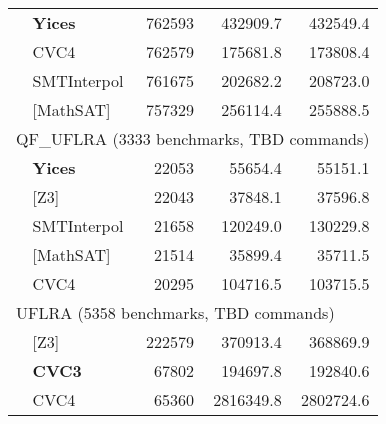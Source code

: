 \begin{tabular}{|p{.1in}l|rrr|}
& \textbf{Yices} & 762593 & 432909.7 & 432549.4 \\
& CVC4 & 762579 & 175681.8 & 173808.4 \\
& SMTInterpol & 761675 & 202682.2 & 208723.0 \\
& [MathSAT] & 757329 & 256114.4 & 255888.5 \\
\hline
\multicolumn{5}{|l|}{QF\_UFLRA (3333 benchmarks, TBD commands)} \\
& \textbf{Yices} & 22053 & 55654.4 & 55151.1 \\
& [Z3] & 22043 & 37848.1 & 37596.8 \\
& SMTInterpol & 21658 & 120249.0 & 130229.8 \\
& [MathSAT] & 21514 & 35899.4 & 35711.5 \\
& CVC4 & 20295 & 104716.5 & 103715.5 \\
\hline
\multicolumn{5}{|l|}{UFLRA (5358 benchmarks, TBD commands)} \\
& [Z3] & 222579 & 370913.4 & 368869.9 \\
& \textbf{CVC3} & 67802 & 194697.8 & 192840.6 \\
& CVC4 & 65360 & 2816349.8 & 2802724.6 \\
\hline
\end{tabular}
